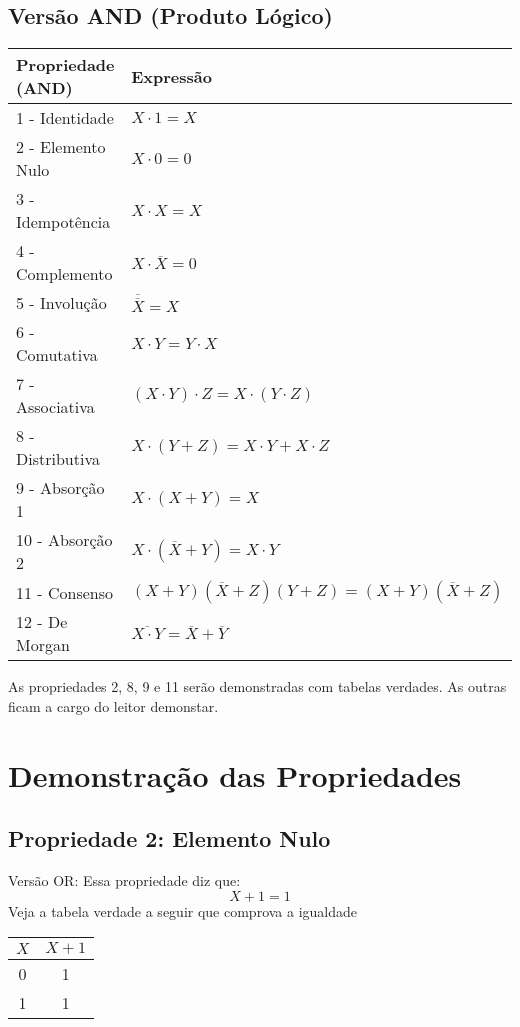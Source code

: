 \documentclass[12pt]{article}
\begin{document}
\vspace{0.5cm}

\subsection{Versão AND (Produto Lógico)}

\begin{center}
\begin{tabular}{|l|l|}
\hline
\textbf{Propriedade (AND)} & \textbf{Expressão} \\
\hline
1 - Identidade       & \( X \cdot 1 = X \) \\
2 - Elemento Nulo    & \( X \cdot 0 = 0 \) \\
3 - Idempotência     & \( X \cdot X = X \) \\
4 - Complemento      & \( X \cdot \overline{X} = 0 \) \\
5 - Involução        & \( \overline{\overline{X}} = X \) \\
6 - Comutativa       & \( X \cdot Y = Y \cdot X \) \\
7 - Associativa      & \( (X \cdot Y) \cdot Z = X \cdot (Y \cdot Z) \) \\
8 - Distributiva     & \( X \cdot (Y + Z) = X \cdot Y + X \cdot Z \) \\
9 - Absorção 1       & \( X \cdot (X + Y) = X \) \\
10 - Absorção 2      & \( X \cdot (\overline{X} + Y) = X \cdot Y \) \\
11 - Consenso        & \( (X + Y)(\overline{X} + Z)(Y + Z) = (X + Y)(\overline{X} + Z) \) \\
12 - De Morgan       & \( \overline{X \cdot Y} = \overline{X} + \overline{Y} \) \\
\hline
\end{tabular}
\end{center}

As propriedades 2, 8, 9 e 11 serão demonstradas com tabelas verdades. As outras ficam a cargo do leitor demonstar.

\section{Demonstração das Propriedades}

\subsection{Propriedade 2: Elemento Nulo}

Versão OR:
Essa propriedade diz que: 
\[
X + 1 = 1
\]
Veja a tabela verdade a seguir que comprova a igualdade
\begin{center}
\begin{tabular}{|c|c|}
\hline
$X$  & $X + 1$ \\
\hline
0 & 1 \\
1 & 1 \\
\hline
\end{tabular}
\end{center}
\end{document}
